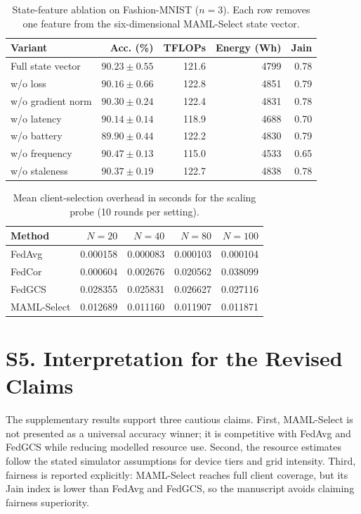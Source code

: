 \documentclass[10pt]{article}
\begin{document}
\begin{table}[!ht]
\centering
\caption{State-feature ablation on Fashion-MNIST ($n=3$). Each row removes one feature from the six-dimensional MAML-Select state vector.}
\label{tab:supp_ablation}
\small
\begin{tabular}{@{}lrrrr@{}}
\toprule
Variant & Acc. (\%) & TFLOPs & Energy (Wh) & Jain \\
\midrule
Full state vector & $90.23 \pm 0.55$ & 121.6 & 4799 & 0.78 \\
w/o loss & $90.16 \pm 0.66$ & 122.8 & 4851 & 0.79 \\
w/o gradient norm & $90.30 \pm 0.24$ & 122.4 & 4831 & 0.78 \\
w/o latency & $90.14 \pm 0.14$ & 118.9 & 4688 & 0.70 \\
w/o battery & $89.90 \pm 0.44$ & 122.2 & 4830 & 0.79 \\
w/o frequency & $90.47 \pm 0.13$ & 115.0 & 4533 & 0.65 \\
w/o staleness & $90.37 \pm 0.19$ & 122.7 & 4838 & 0.78 \\
\bottomrule
\end{tabular}
\end{table}

\begin{table}[!ht]
\centering
\caption{Mean client-selection overhead in seconds for the scaling probe (10 rounds per setting).}
\label{tab:supp_scaling}
\small
\begin{tabular}{@{}lrrrr@{}}
\toprule
Method & $N=20$ & $N=40$ & $N=80$ & $N=100$ \\
\midrule
FedAvg & 0.000158 & 0.000083 & 0.000103 & 0.000104 \\
FedCor & 0.000604 & 0.002676 & 0.020562 & 0.038099 \\
FedGCS & 0.028355 & 0.025831 & 0.026627 & 0.027116 \\
MAML-Select & 0.012689 & 0.011160 & 0.011907 & 0.011871 \\
\bottomrule
\end{tabular}
\end{table}

\section*{S5. Interpretation for the Revised Claims}

The supplementary results support three cautious claims. First, MAML-Select is not presented as a universal accuracy winner; it is competitive with FedAvg and FedGCS while reducing modelled resource use. Second, the resource estimates follow the stated simulator assumptions for device tiers and grid intensity. Third, fairness is reported explicitly: MAML-Select reaches full client coverage, but its Jain index is lower than FedAvg and FedGCS, so the manuscript avoids claiming fairness superiority.
\end{document}
